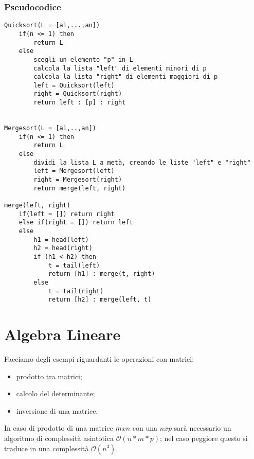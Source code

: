 \subsubsection{Pseudocodice}
\begin{verbatim}
Quicksort(L = [a1,...,an])
    if(n <= 1) then
        return L
    else
        scegli un elemento "p" in L
	    calcola la lista "left" di elementi minori di p
	    calcola la lista "right" di elementi maggiori di p
	    left = Quicksort(left)
	    right = Quicksort(right)
	    return left : [p] : right


Mergesort(L = [a1,..,an])
    if(n <= 1) then
        return L
    else
        dividi la lista L a metà, creando le liste "left" e "right" 
        left = Mergesort(left)
        right = Mergesort(right)
        return merge(left, right)
        
merge(left, right)
    if(left = []) return right
    else if(right = []) return left
    else
        h1 = head(left)
        h2 = head(right)
        if (h1 < h2) then
            t = tail(left)
            return [h1] : merge(t, right)
        else
            t = tail(right)
            return [h2] : merge(left, t)
\end{verbatim}
\section{Algebra Lineare}
Facciamo degli esempi riguardanti le operazioni con matrici:
\begin{itemize}
\item{prodotto tra matrici;}
\item{calcolo del determinante;}
\item{inversione di una matrice.}
\end{itemize}
In caso di prodotto di una matrice $mxn$ con una $nxp$ sarà necessario un algoritmo di complessità asintotica  $\mathcal {O}(n*m*p)$; nel caso peggiore questo si traduce in una complessità $\mathcal {O}(n^3)$.

